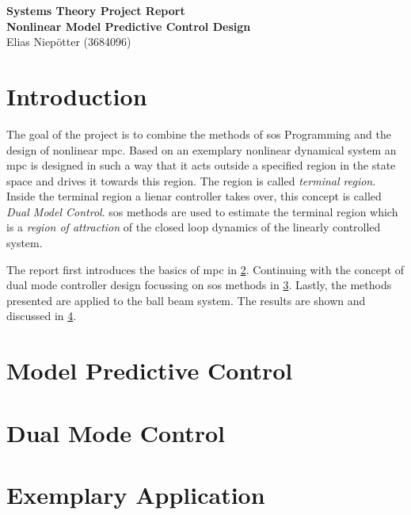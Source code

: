 \documentclass[10pt,a4paper]{article}
\begin{document}
\pagestyle{fancy}

\setlength\intextsep{5pt}
\setlength{\belowcaptionskip}{0pt}

\setlength{\parindent}{0pt}


\begin{center}
	\LARGE{\textbf{Systems Theory Project Report}}\\[0.25em]
	\normalsize\textbf{Nonlinear Model Predictive Control Design}\\[0.25em]
	\normalsize{Elias Niepötter (3684096)}
\end{center}

\vskip 0.5cm

\begin{abstract}
	\lipsum[1]
\end{abstract}

\vskip 1cm

\begin{multicols}{2}

\section{Introduction}
The goal of the project is to combine the methods of \gls{sos} Programming and the design of nonlinear \gls{mpc}. Based on an exemplary nonlinear dynamical system
an \gls{mpc} is designed in such a way that it acts outside a specified region in the state space and drives it towards this region.
The region is called \textit{terminal region}. Inside the terminal region a lienar controller takes over, this concept is called \textit{Dual Model Control}.
\gls{sos} methods are used to estimate the terminal region which is a \textit{region of attraction} of the closed loop dynamics of the linearly controlled 
system.

The report first introduces the basics of \gls{mpc} in \ref{sec:mpc}. Continuing with the concept of dual mode controller design focussing on \gls{sos} methods in \ref{sec:dualModeControl}.
Lastly, the methods presented are applied to the ball beam system. The results are shown and discussed in \ref{sec:example}.

\section{Model Predictive Control}
\label{sec:mpc}
\lipsum[1-2]

\section{Dual Mode Control}
\label{sec:dualModeControl}
\lipsum[1-2]

\section{Exemplary Application}
\label{sec:example}
\lipsum[1-2]


\end{multicols}
\end{document}
